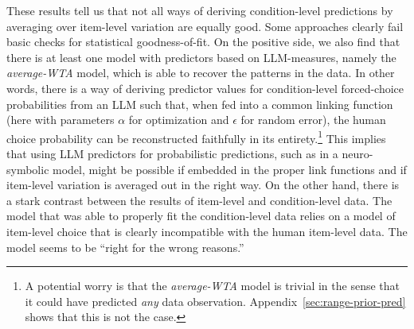 \documentclass[fleqn]{article}
\begin{document}





These results tell us that not all ways of deriving condition-level predictions by averaging over item-level variation are equally good.
Some approaches clearly fail basic checks for statistical goodness-of-fit.
On the positive side, we also find that there is at least one model with predictors based on LLM-measures, namely the \emph{average-WTA} model, which is able to recover the patterns in the data.
In other words, there is a way of deriving predictor values for condition-level forced-choice probabilities from an LLM such that, when fed into a common linking function (here with parameters $\alpha$ for optimization and $\epsilon$ for random error), the human choice probability can be reconstructed faithfully in its entirety.\footnote{
  A potential worry is that the \emph{average-WTA} model is trivial in the sense that it could have predicted \emph{any} data observation.
  Appendix~\ref{sec:range-prior-pred} shows that this is not the case.
}
This implies that using LLM predictors for probabilistic predictions, such as in a neuro-symbolic model, might be possible if embedded in the proper link functions and if item-level variation is averaged out in the right way.
On the other hand, there is a stark contrast between the results of item-level and condition-level data.
The model that was able to properly fit the condition-level data relies on a model of item-level choice that is clearly incompatible with the human item-level data.
The model seems to be ``right for the wrong reasons.''
\end{document}
